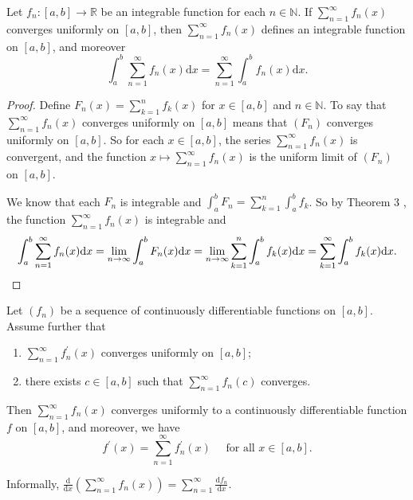 \documentclass[a4paper]{article}
\begin{document}
\begin{corollary}\label{col:4}
    Let $f_{n}:[a, b] \rightarrow \mathbb{R}$ be an integrable function for each $n \in \mathbb{N}$. If $\sum_{n=1}^{\infty} f_{n}(x)$ converges uniformly on $[a, b]$, then $\sum_{n=1}^{\infty} f_{n}(x)$ defines an integrable function on $[a, b]$, and moreover
    \[
    \int_{a}^{b} \sum_{n=1}^{\infty} f_{n}(x) \mathrm{d} x=\sum_{n=1}^{\infty} \int_{a}^{b} f_{n}(x) \mathrm{d} x.
    \]
\end{corollary}
\begin{proof}
    Define $F_{n}(x)=\sum_{k=1}^{n} f_{k}(x)$ for $x \in[a, b]$ and $n \in \mathbb{N}$. To say that $\sum_{n=1}^{\infty} f_{n}(x)$ converges uniformly on $[a, b]$ means that $\left(F_{n}\right)$ converges uniformly on $[a, b]$. So for each $x \in[a, b]$, the series $\sum_{n=1}^{\infty} f_{n}(x)$ is convergent, and the function $x \mapsto \sum_{n=1}^{\infty} f_{n}(x)$ is the uniform limit of $\left(F_{n}\right)$ on $[a, b]$.

    We know that each $F_{n}$ is integrable and $\int_{a}^{b} F_{n}=\sum_{k=1}^{n} \int_{a}^{b} f_{k}$. So by Theorem 3 , the function $\sum_{n=1}^{\infty} f_{n}(x)$ is integrable and
    \[
    \int_{a}^{b} \sum_{n=1}^{\infty} f_{n}(x) \mathrm{d} x=\lim _{n \rightarrow \infty} \int_{a}^{b} F_{n}(x) \mathrm{d} x=\lim _{n \rightarrow \infty} \sum_{k=1}^{n} \int_{a}^{b} f_{k}(x) \mathrm{d} x=\sum_{k=1}^{\infty} \int_{a}^{b} f_{k}(x) \mathrm{d} x.\qedhere
    \]
\end{proof}
\begin{theorem}\label{thm:5}
    Let $\left(f_{n}\right)$ be a sequence of continuously differentiable functions on $[a, b]$. Assume further that
    \begin{enumerate}
        \item $\sum_{n=1}^{\infty} f_{n}^{\prime}(x)$ converges uniformly on $[a, b]$;
        \item there exists $c \in[a, b]$ such that $\sum_{n=1}^{\infty} f_{n}(c)$ converges.
    \end{enumerate}
    Then $\sum_{n=1}^{\infty} f_{n}(x)$ converges uniformly to a continuously differentiable function $f$ on $[a, b]$, and moreover, we have
    \[
    f^{\prime}(x)=\sum_{n=1}^{\infty} f_{n}^{\prime}(x) \quad \text { for all } x \in[a, b].
    \]
\end{theorem}
\begin{note}
    Informally, $\displaystyle \frac{\mathrm{d}}{\mathrm{d}x}\left( \sum_{n=1}^{\infty}f_n(x) \right) = \sum_{n=1}^{\infty}\frac{\mathrm{d}f_n}{\mathrm{d}x}  $. 
\end{note}
\end{document}

